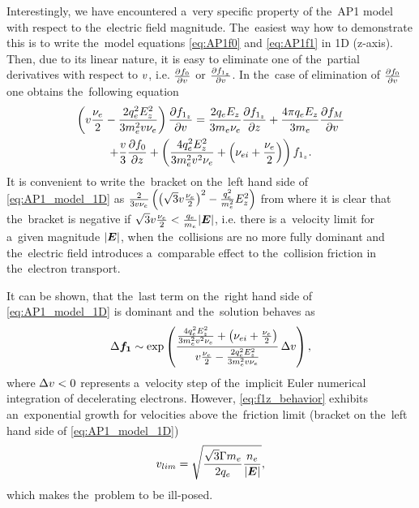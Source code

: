 Interestingly, we have encountered a~very specific property of the~AP1 model
with respect to the~electric field magnitude. The~easiest way how to 
demonstrate this is to write the~model equations \eqref{eq:AP1f0} and 
\eqref{eq:AP1f1} in 1D (z-axis). Then, due to its linear nature, it is easy 
to eliminate one of the~partial derivatives with respect to $v$, i.e. 
$\frac{\partial{f_0}}{\partial{v}}$ or $\frac{\partial{f_{1_z}}}{\partial{v}}$. 
In the~case of elimination of $\frac{\partial{f_0}}{\partial{v}}$ 
one obtains the~following equation
\begin{multline}
  \left(v\frac{\nu_{e}}{2} - \frac{2q_e^2E_z^2}{3m_e^2v\nu_{e}}\right) 
  \frac{\partial{f_{1_z}}}{\partial{v}} 
  =
  \frac{2q_eE_z}{3m_e\nu_{e}}\frac{\partial{f_{1_z}}}{\partial{z}}  
  + \frac{4\pi q_eE_z}{3m_e}\frac{\partial{f_M}}{\partial{v}} \\
  + \frac{v}{3}\frac{\partial{f_0}}{\partial{z}} 
  + \left(\frac{4q_e^2E_z^2}{3m_e^2v^2\nu_{e}}
  + \left(\nu_{ei} + \frac{\nu_{e}}{2}\right) \right)f_{1_z} .
  \label{eq:AP1_model_1D}
\end{multline}
It is convenient to write the~bracket on the~left hand side of 
\eqref{eq:AP1_model_1D} as
$\frac{2}{3v\nu_{e}} 
\left(\left(\sqrt{3}v\frac{\nu_{e}}{2}\right)^2 
- \frac{q_e^2}{m_e^2}E_z^2\right)$
from where it is clear that the~bracket is negative if 
$\sqrt{3}v\frac{\nu_{e}}{2} < \frac{q_e}{m_e}|\boldsymbol{E}|$, 
i.e. there is a~velocity limit for a~given magnitude $|\boldsymbol{E}|$, 
when the~collisions are no more fully dominant and the~electric field 
introduces a~comparable effect to the~collision friction in 
the~electron transport.

It can be shown, that the~last term on the~right hand side of 
\eqref{eq:AP1_model_1D} is dominant and the~solution behaves as 
\begin{equation}
  \Delta {\boldsymbol{f_1}} \sim \exp\left(\frac{\frac{4q_e^2E_z^2}{3m_e^2v^2\nu_{e}}
  + \left(\nu_{ei} + \frac{\nu_{e}}{2}\right)}
  {v\frac{\nu_{e}}{2} - \frac{2q_e^2E_z^2}{3m_e^2v\nu_{e}}}\, 
  \Delta v\right) ,
  \label{eq:f1z_behavior}
\end{equation}
where $\Delta v < 0$ represents a~velocity step of the~implicit Euler
numerical integration of decelerating electrons.
However, \eqref{eq:f1z_behavior} exhibits an~exponential growth 
for velocities above the~friction limit (bracket on the~left hand side of 
\eqref{eq:AP1_model_1D})
\begin{equation}
  v_{lim}  = \sqrt{\frac{\sqrt{3}\Gamma m_e}{2q_e}\frac{n_e}{|\boldsymbol{E}|}} ,
  \label{eq:v_limit}
\end{equation}
which makes the~problem to be ill-posed.

